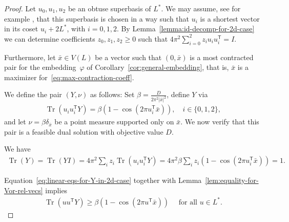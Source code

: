 \documentclass{amsart}
\DeclareMathOperator{\Tr}{Tr}
\begin{document}
\begin{proof}
  Let $u_0,u_1,u_2$ be an obtuse superbasis of $L^*$. We may assume,
  see for example \cite{Conway1992}, that this superbasis is chosen in
  a way such that $u_i$ is a shortest vector in its coset
  $u_i + 2L^*$, with $i = 0, 1, 2$. By
  Lemma~\ref{lemma:id-decomp-for-2d-case} we can determine coefficients
  $z_0,z_1,z_2 \ge 0$ such that
  $4\pi^2 \sum_{i = 0}^2 z_i u_iu_i^\mathsf{T} = I$.

  Furthermore, let $\bar{x} \in V(L)$ be a vector such that $(0,\bar{x})$
  is a most contracted pair for the embedding~$\varphi$ of
  Corollary~\ref{cor:general-embedding}, that is, $\bar{x}$ is a
  maximizer for~\eqref{eq:max-contraction-coeff}.

  We define the pair $(Y,\nu)$ as follows: Set $\beta =
  \frac{D}{2\pi^2 |\bar{x}|^2}$, define $Y$ via
    \begin{align}
      \label{eq:linear-eqs-for-Y-in-2d-case}
      \Tr(u_{i}u_{i}^\mathsf{T}Y) =  \beta (1-\cos(2\pi u_{i}^\mathsf{T} \bar{x})), \quad i \in \{0,1,2\},
    \end{align}
    and let $\nu = \beta \delta_{\bar{x}}$ be a point measure supported
    only on $\bar{x}$. We now verify that this pair is a feasible dual
    solution with objective value $D$.

    We have
	\begin{align*}
		\Tr(Y) = \Tr(Y I) = 4\pi^2 \sum_{i} z_i
          \Tr(u_iu_i^\mathsf{T} Y) = 4 \pi^2 \beta  \sum_i z_i (1-\cos(2\pi u_{i}^\mathsf{T}\bar{x} )) = 1.
	\end{align*}

	Equation~\eqref{eq:linear-eqs-for-Y-in-2d-case} together with
        Lemma~\ref{lem:equality-for-Vor-rel-vecs} implies
	\begin{align*}
		\Tr(u u^\mathsf{T}Y)\geq  \beta (1-\cos(2\pi
          u^\mathsf{T} \bar{x})) \quad \text{ for all } u \in L^*.
	\end{align*}


\end{proof}
\end{document}
